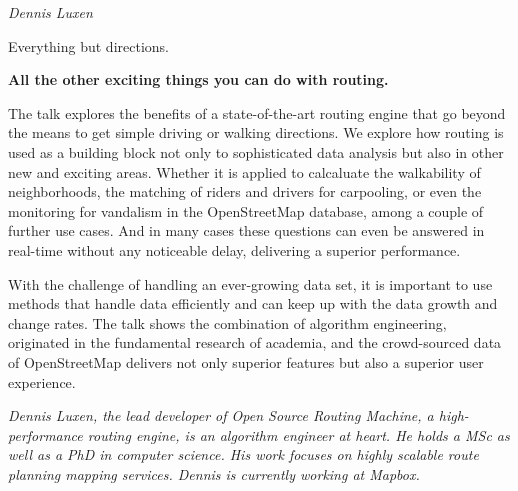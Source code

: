 \newcommand{\talkabstract}[4]%
{%
\newpage%
\subsection*{#1}%
\subsubsection*{#2}%
#4 \par%
{\em{#3}}%
}

%
\newcommand{\abstractwithspeaker}[5]%
{%
\newpage%
\noindent \emph{#1}%
\vspace{0.75em}
{\par\noindent\large \sectfont #2}%
\vspace*{0.35em}%
{\par\noindent\bfseries \normalsize \sectfont #3}
\vspace{1em}
\par\noindent #5 \par%
{\em{#4}}%
}

\newcommand{\talkabstractwithoutsub}[3]%
{%
\newpage%
\subsection*{#1}%
#3 \par%
{\em{#2}}%
}

\abstractwithspeaker{Dennis Luxen}{Everything but directions.}%
{All the other exciting things you can do with routing.}%
{Dennis Luxen, the lead developer of Open Source Routing Machine, a high-performance routing engine, is an algorithm engineer at heart. He holds a MSc as well as a PhD in computer science. His work focuses on highly scalable route planning mapping services. Dennis is currently working at Mapbox. }%
{The talk explores the benefits of a state-of-the-art routing engine that go beyond the means to get simple driving or walking directions. We explore how 
routing is used as a building block not only to sophisticated data analysis but also in other new and exciting areas. Whether it is applied to calcaluate the walkability of neighborhoods, the matching of riders and drivers for carpooling, or even the monitoring for vandalism in the OpenStreetMap database, 
among a couple of further use cases. And in many cases these questions can even be answered in real-time without any noticeable delay, delivering a superior performance.

With the challenge of handling an ever-growing data set, it is important to use methods that handle data efficiently and can keep up with the data growth and change rates. The talk shows the combination of algorithm engineering, originated in the fundamental research of academia, and the crowd-sourced data 
of OpenStreetMap delivers not only superior features but also a superior user experience.}

